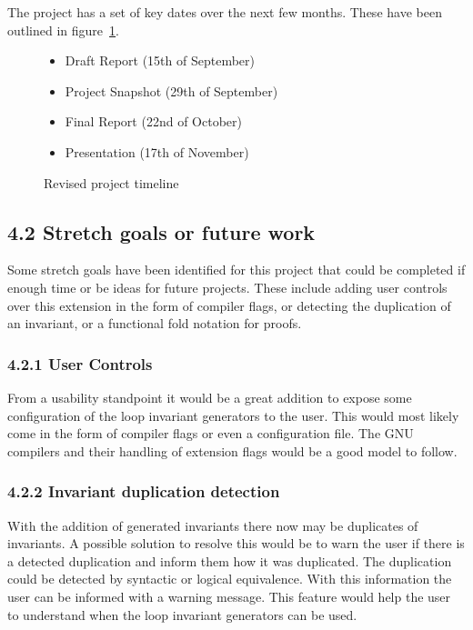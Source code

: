 \documentclass[11pt, a4paper, twoside, openright]{report}
\begin{document}
The project has a set of key dates over the next few months.
These have been outlined in figure~\ref{list:timeline}.

\begin{figure}[h]
    \begin{itemize}
        \item Draft Report (15th of September)
        \item Project Snapshot (29th of September) 
        \item Final Report (22nd of October)
        \item Presentation (17th of November)
    \end{itemize}
    \caption{Revised project timeline}\label{list:timeline}
\end{figure}

\subsection*{4.2 Stretch goals or future work}

Some stretch goals have been identified for this project that could
be completed if enough time or be ideas for future projects.
These include adding user controls over this extension in the
form of compiler flags, or detecting the duplication of an invariant,
or a functional fold notation for proofs.

\subsubsection*{4.2.1 User Controls}
From a usability standpoint it would be a great addition to expose
some configuration of the loop invariant generators to the user.
This would most likely come in the form of compiler flags or even
a configuration file. The GNU compilers and their handling of
extension flags would be a good model to follow.

\subsubsection*{4.2.2 Invariant duplication detection}
With the addition of generated invariants there now may be 
duplicates of invariants. A possible solution to resolve this would 
be to warn the user if there is a detected duplication and
inform them how it was duplicated.
The duplication could be detected by syntactic or logical equivalence.
With this information the user can be informed with a warning message.
This feature would help the user to understand when the loop invariant
generators can be used.
\end{document}
